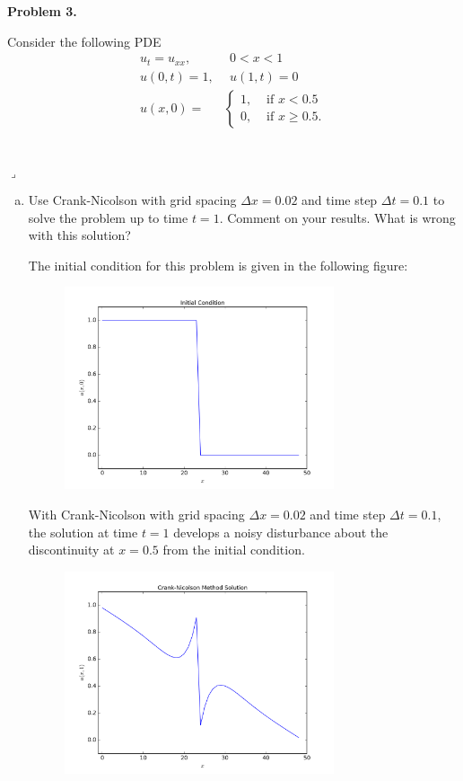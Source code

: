 \documentclass[12pt]{article}
\newenvironment{myprob}[1]
    {%
    \noindent{\Huge$\ulcorner$}\textbf{#1.}\begin{em}
    }
    { 
    \end{em} \\ \hphantom{l} \hfill {\Huge$\lrcorner$} }
\begin{document}
\begin{myprob}{Problem 3}
Consider the following PDE
\begin{align*}
u_t = u_{xx},& \ \ 0<x<1 \\
u(0,t)=1,& \ \ u(1,t)=0 \\
u(x,0) = &\begin{cases} 1, &\text{ if } x< 0.5 \\
0, &\text{ if } x\geq0.5.
\end{cases}
\end{align*}
\end{myprob}
\begin{enumerate}[(a)]
\item Use Crank-Nicolson with grid spacing $\Delta x = 0.02$ and time step $\Delta t = 0.1$ to solve the problem up to time $t=1$. Comment on your results.  What is wrong with this solution?

The initial condition for this problem is given in the following figure:
\begin{figure}[H]
\centering\includegraphics[width=0.75\textwidth]{problem3_initial_condition.png}
\end{figure}

With Crank-Nicolson with grid spacing $\Delta x = 0.02$ and time step $\Delta t = 0.1$, the solution at time $t=1$ develops a noisy disturbance about the discontinuity at $x=0.5$ from the initial condition.

\begin{figure}[H]
\centering\includegraphics[width=0.75\textwidth]{problem3_crank_nicolson_issue.png}
\end{figure}


\end{enumerate}
\end{document}

